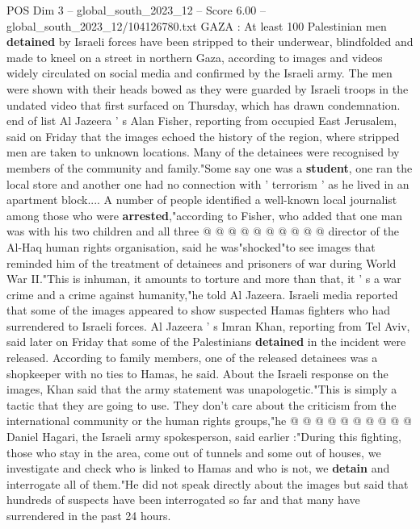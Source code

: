 \begin{textsample}{POS Dim 3 – global\_south\_2023\_12 – Score 6.00 – global\_south\_2023\_12/104126780.txt}  \label{ex:f3_pos_448}
GAZA : At least 100 Palestinian men \textbf{detained} by Israeli forces have been stripped to their underwear, blindfolded and made to kneel on a street in northern Gaza, according to images and videos widely circulated on social media and confirmed by the Israeli army.
The men were shown with their heads bowed as they were guarded by Israeli troops in the undated video that first surfaced on Thursday, which has drawn condemnation. end of list Al Jazeera ' s Alan Fisher, reporting from occupied East Jerusalem, said on Friday that the images echoed the history of the region, where stripped men are taken to unknown locations.
Many of the detainees were recognised by members of the community and family."Some say one was a \textbf{student}, one ran the local store and another one had no connection with ' terrorism ' as he lived in an apartment block....
A number of people identified a well-known local journalist among those who were \textbf{arrested},"according to Fisher, who added that one man was with his two children and all three @ @ @ @ @ @ @ @ @ @ director of the Al-Haq human rights organisation, said he was"shocked"to see images that reminded him of the treatment of detainees and prisoners of war during World War II."This is inhuman, it amounts to torture and more than that, it ' s a war crime and a crime against humanity,"he told Al Jazeera.
Israeli media reported that some of the images appeared to show suspected Hamas fighters who had surrendered to Israeli forces.
Al Jazeera ' s Imran Khan, reporting from Tel Aviv, said later on Friday that some of the Palestinians \textbf{detained} in the incident were released.
According to family members, one of the released detainees was a shopkeeper with no ties to Hamas, he said.
About the Israeli response on the images, Khan said that the army statement was unapologetic."This is simply a tactic that they are going to use.
They don't care about the criticism from the international community or the human rights groups,"he @ @ @ @ @ @ @ @ @ @ Daniel Hagari, the Israeli army spokesperson, said earlier :"During this fighting, those who stay in the area, come out of tunnels and some out of houses, we investigate and check who is linked to Hamas and who is not, we \textbf{detain} and interrogate all of them."He did not speak directly about the images but said that hundreds of suspects have been interrogated so far and that many have surrendered in the past 24 hours.

\end{textsample}
